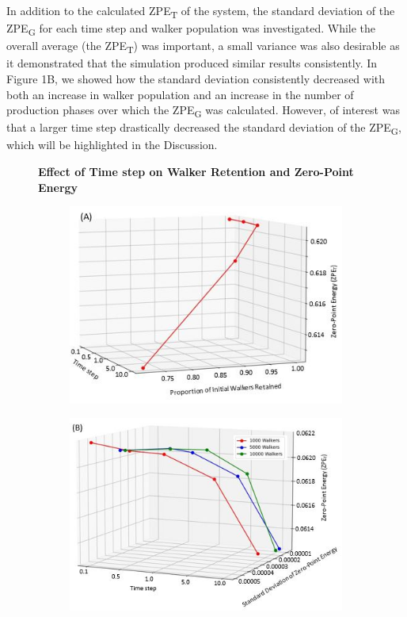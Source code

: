 \documentclass[journal=jacsat,manuscript=article]{achemso}
\newcommand*{\figuretitle}[1]{%
    {\centering%
    \textbf{#1}%
    \par\medskip}%
}
\begin{document}
In addition to the calculated ZPE\textsubscript{T} of the system, the standard deviation of the ZPE\textsubscript{G} for each time step and walker population was investigated. While the overall average (the ZPE\textsubscript{T}) was important, a small variance was also desirable as it demonstrated that the simulation produced similar results consistently. In Figure 1B, we showed how the standard deviation consistently decreased with both an increase in walker population and an increase in the number of production phases over which the ZPE\textsubscript{G} was calculated. However, of interest was that a larger time step drastically decreased the standard deviation of the ZPE\textsubscript{G}, which will be highlighted in the Discussion. 

\begin{figure}[H]
\centering
\figuretitle{Effect of Time step on Walker Retention and Zero-Point Energy}
\begin{subfigure}{.5\textwidth}
  \centering
  \includegraphics[width=\linewidth]{figures/fig_2A.jpg}
\end{subfigure}%
\begin{subfigure}{.5\textwidth}
  \centering
  \includegraphics[width=\linewidth]{figures/fig_2B.jpg}

\end{subfigure}
\end{figure}
\end{document}
